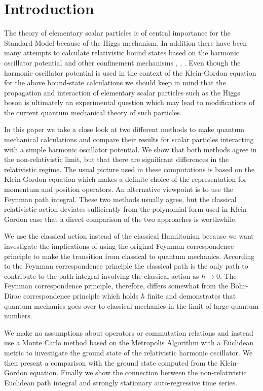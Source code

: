 \section{Introduction }
The theory of elementary sca\-lar particles is of central importance 
for the Standard Model because of the Higgs mechanism. In addition
there have been many attempts to calculate relativistic bound states 
based on the harmonic oscillator potential and other confinement
mechanisms \cite{bib:gunion1}, \cite{bib:gunion2}, \cite{bib:hey}.
Even though the harmonic oscillator potential is used 
in the context of the Klein-Gordon equation 
for the above bound-state calculations we
should keep in mind that the propagation and interaction of 
elementary sca\-lar particles such as the 
Higgs boson is ultimately an experimental question which may lead to 
modifications of the current quantum mechanical theory of such particles.

In this paper we take a close look at two different methods to 
make quantum mechanical calculations and compare their results for
scalar particles interacting with a simple harmonic oscillator potential.
We show that both methods agree in the non-relativistic limit, but 
that there are significant differences in the relativistic regime.
The usual picture used in these computations 
is based on the Klein-Gordon equation which makes a definite choice of the 
representation for momentum and position operators. An alternative viewpoint
is to use the Feynman path integral. 
These two methods usually agree, but
the classical relativistic action deviates sufficiently from 
the polynomial form used in Klein-Gordon case that 
a direct comparison of the two approaches is worthwhile.

We use the classical action instead of the classical Hamiltonian because we
want investigate the implications of 
using the original Feynman correspondence principle to make
the transition from classical to quantum mechanics. According to the 
Feynman correspondence principle the classical path is the only path to 
contribute to the path integral involving the classical action 
as $\hbar \rightarrow 0$. The Feynman correspondence principle, 
therefore, differs somewhat from 
the Bohr-Dirac correspondence principle which holds $\hbar$ finite and 
demonstrates that quantum mechanics 
goes over to classical mechanics in the limit of large quantum numbers.

We make no assumptions about operators or commutation relations and 
instead use a Monte Carlo
method based on the Metropolis Algorithm \cite{bib:metropolis}
 with a Euclidean metric 
to investigate the ground state of the relativistic harmonic oscillator.
We then present a comparison with the ground state computed from the
Klein-Gordon equation. Finally we show the connection between the
non-relativistic Euclidean path integral and strongly stationary
auto-regressive time series.

